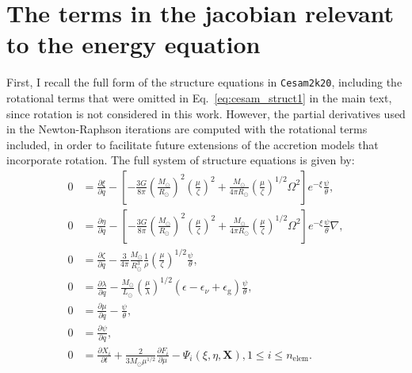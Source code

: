 \documentclass[12pt,a4paper]{article}
\newcommand{\mr}{\mathrm}
\newcommand{\pfird}[2][]{\frac{\partial#1}{\partial#2}}
\newcommand{\bvec}[1]{\boldsymbol{#1}}
\begin{document}
\newpage
\printbibliography[heading=bibintoc, title={References}]

\newpage
{}
\appendix

\section*{The terms in the jacobian relevant to the energy equation}
\label{app:jacobian}
\renewcommand{\theequation}{A.\arabic{equation}}
\setcounter{equation}{0}

First, I recall the full form of the structure equations in \texttt{Cesam2k20}, including the rotational terms that were omitted in Eq.~\eqref{eq:cesam_struct1} in the main text, since rotation is not considered in this work. However, the partial derivatives used in the Newton-Raphson iterations are computed with the rotational terms included, in order to facilitate future extensions of the accretion models that incorporate rotation. The full system of structure equations is given by:
\begin{subequations} \label{eq:cesam2k20_struct_eq_full}
  \begin{align}
    0 &= \pfird[\xi]{q} - \left[-\frac{3G}{8\pi}\left(\frac{M_\odot}{R_\odot}\right)^2\left(\frac{\mu}{\zeta}\right)^2 + \frac{M_\odot}{4\pi R_\odot}\left(\frac{\mu}{\zeta}\right)^{1/2} \Omega^2\right]e^{-\xi}\frac{\psi}{\theta}, \label{eq:cesam_struct1_full}\\
    0 &= \pfird[\eta]{q} - \left[-\frac{3G}{8\pi}\left(\frac{M_\odot}{R_\odot}\right)^2\left(\frac{\mu}{\zeta}\right)^2 + \frac{M_\odot}{4\pi R_\odot}\left(\frac{\mu}{\zeta}\right)^{1/2} \Omega^2\right]e^{-\xi}\frac{\psi}{\theta}\nabla, \label{eq:cesam_struct2_full}\\
    0 &= \pfird[\zeta]{q} - \frac{3}{4\pi}\frac{M_\odot}{R_\odot^3}\frac{1}{\rho}\left(\frac{\mu}{\zeta}\right)^{1/2}\frac{\psi}{\theta}, \label{eq:cesam_struct3_full}\\
    0 &= \pfird[\lambda]{q} - \frac{M_\odot}{L_\odot}\left(\frac{\mu}{\lambda}\right)^{1/2}(\epsilon  - \epsilon_\nu + \epsilon_\mr{g})\frac{\psi}{\theta}, \label{eq:cesam_struct4_full}\\
    0 &= \pfird[\mu]{q} - \frac{\psi}{\theta}, \label{eq:cesam_struct5_full}\\
    0 &= \pfird[\psi]{q}, \label{eq:cesam_struct6_full}\\
    0 &= \pfird[X_i]{t} + \frac{2}{3 M_\odot\mu^{1/2}}\pfird[F_i]{\mu} - \Psi_i(\xi, \eta, \bvec{X}), 1\leq i \leq n_\mr{elem}. \label{eq:cesam_struct7_full}
  \end{align}
\end{subequations}
\end{document}
